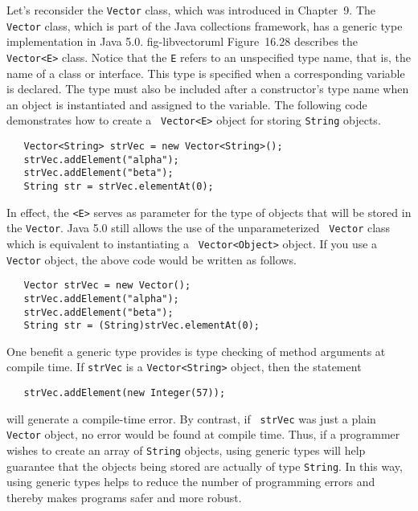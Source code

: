 Let's reconsider the {\tt Vector} class, which was introduced in
Chapter~9.  The {\tt Vector} class, which is part of the Java collections
framework, has a generic type implementation in Java 5.0.
{fig-libvectoruml}
Figure~16.28 describes the {\tt Vector<E>} class. Notice that the
{\tt E} refers to an unspecified type name, that is, the name of a
class or interface.  This type is specified when a corresponding
variable is declared. The type must also be included after a
constructor's type name when an object is instantiated and assigned to
the variable.  The following code demonstrates how to create a {\tt
Vector<E>} object for storing {\tt String} objects.

\begin{jjjlisting}
\begin{lstlisting}
   Vector<String> strVec = new Vector<String>();
   strVec.addElement("alpha");
   strVec.addElement("beta");
   String str = strVec.elementAt(0);
\end{lstlisting}
\end{jjjlisting}

\noindent In effect, the {\tt <E>} serves as parameter for the
type of objects that will be stored in the {\tt Vector}. 
Java 5.0 still allows the use of the unparameterized {\tt
Vector} class which is equivalent to instantiating a {\tt
Vector<Object>} object.  If you use a {\tt Vector} object, the above
code would be written as follows.

\begin{jjjlisting}
\begin{lstlisting}
   Vector strVec = new Vector();
   strVec.addElement("alpha");
   strVec.addElement("beta");
   String str = (String)strVec.elementAt(0);
\end{lstlisting}
\end{jjjlisting}

One benefit a generic type provides is type checking of method arguments
at compile time.  If {\tt strVec} is a {\tt Vector<String>} object, then the
statement

\begin{jjjlisting}
\begin{lstlisting}
   strVec.addElement(new Integer(57));
\end{lstlisting}
\end{jjjlisting}

\noindent will generate a compile-time error.  By contrast, if {\tt
strVec} was just a plain {\tt Vector} object, no error would be found
at compile time.  Thus, if a programmer wishes to create an array of
{\tt String} objects, using generic types will help guarantee that the
objects being stored are actually of type {\tt String}. In this way,
using generic types helps to reduce the number of programming errors
and thereby makes programs safer and more robust.

